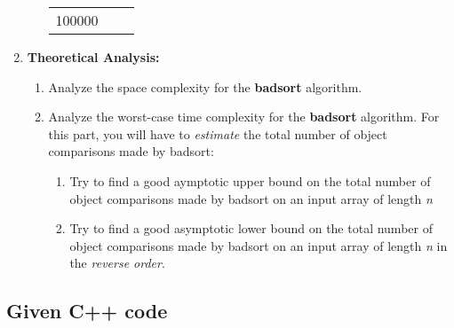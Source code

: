\begin{enumerate}
\begin{enumerate}
\begin{tabular}{l l l}
100000 &           &         \\
  \end{tabular}
  \end{enumerate}
\item \textbf{Theoretical Analysis:}
  \begin{enumerate}
  \item Analyze the space complexity for the \textbf{badsort} algorithm.
  \item Analyze the worst-case time complexity for the \textbf{badsort} algorithm. For this part, you will have to \emph{estimate} the total number of object comparisons made by badsort:
    \begin{enumerate}
    \item Try to find a good aymptotic upper bound on the total number of object comparisons made by badsort on an input array of length \emph{n}
    \item Try to find a good asymptotic lower bound on the total number of object comparisons made by badsort on an input array of length \emph{n} in the \emph{reverse order}.
    \end{enumerate}
  \end{enumerate}
\end{enumerate}

\subsection{Given C++ code}

